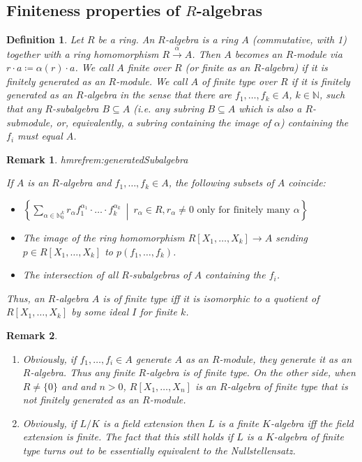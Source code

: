 \documentclass[DIV=14,parskip=full,pointednumbers]{scrartcl}
\newenvironment{alphanumerate}{\begin{enumerate}[label={\upshape(\alph*)}]}{\end{enumerate}}
\theoremstyle{cthm}
\theoremstyle{cvarthm}
\theoremstyle{cdef}
\newtheorem{defi}{Definition}[subsection]
\newtheorem{rem}{Remark}[subsection]
\newcommand{\lbl}[1]{
	\label{#1}
	\edef\dummy{\curthm}
	\expandafter\xdef\csname thmref#1\endcsname{\dummy}
}
\newcommand{\IN}{\mathbb{N}}
\newcommand{\longto}{\longrightarrow}
\newcommand{\st}{\ \middle|\ }
\begin{document}
\subsection{Finiteness properties of \texorpdfstring{$R$}{R}-algebras}
\begin{defi}
 Let $R$ be a ring. An \emph{$R$-algebra} is a ring $A$ (commutative, with 1) together with a ring homomorphism $R\overset{\alpha}{\longto} A$. Then $A$ becomes an $R$-module via $r\cdot a \coloneqq \alpha(r) \cdot a$. We call $A$ \emph{finite over $R$} (or \emph{finite as an $R$-algebra}) if it is finitely generated as an $R$-module. We call $A$ of \emph{finite type over $R$} if it is finitely generated as an $R$-algebra in the sense that there are $f_1,\ldots, f_k\in A$, $k\in \IN$, such that any $R$-subalgebra $B\subseteq A$ (i.e. any subring $B\subseteq A$ which is also a $R$-submodule, or, equivalently, a subring containing the image of $\alpha$) containing the $f_i$ must equal $A$.
\end{defi}
\begin{rem}\lbl{rem:generatedSubalgebra}
 If $A$ is an $R$-algebra and $f_1,\ldots,f_k\in A$, the following subsets of $A$ coincide:
 \begin{itemize}
  \item $\left\{\sum_{\alpha\in\IN_0^k} r_\alpha f_1^{\alpha_1}\cdot\ldots\cdot f_k^{\alpha_k}\st r_\alpha\in R, r_\alpha\neq 0 \text{ only for finitely many } \alpha\right\}$
  \item The image of the ring homomorphism $R[X_1,\ldots,X_k]\to A$ sending $p\in R[X_1,\ldots, X_k]$ to $p(f_1,\ldots,f_k)$.
  \item The intersection of all $R$-subalgebras of $A$ containing the $f_i$.
 \end{itemize}
Thus, an $R$-algebra $A$ is of finite type iff it is isomorphic to a quotient of $R[X_1,\ldots, X_k]$ by some ideal $I$ for finite $k$.
\end{rem}
\begin{rem}
\begin{alphanumerate}
 \item Obviously, if $f_1,\ldots, f_i\in A$ generate $A$ as an $R$-module, they generate it as an $R$-algebra. Thus any finite $R$-algebra is of finite type. On the other side, when $R\neq \{0\}$ and and $n>0$, $R[X_1, \ldots, X_n]$ is an $R$-algebra of finite type that is not finitely generated as an $R$-module.
\item Obviously, if $L/K$ is a field extension then $L$ is a finite $K$-algebra iff the field extension is finite. The fact that this still holds if $L$ is a $K$-algebra of finite type turns out to be essentially equivalent to the Nullstellensatz.
 \end{alphanumerate}

\end{rem}
\end{document}
